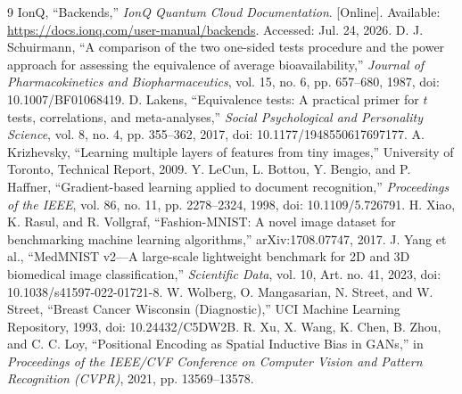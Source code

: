 \documentclass[11pt]{article}
\begin{document}
\begin{thebibliography}{9}
 IonQ, ``Backends,'' \textit{IonQ Quantum Cloud Documentation}. [Online]. Available: \url{https://docs.ionq.com/user-manual/backends}. Accessed: Jul. 24, 2026.
 D. J. Schuirmann, ``A comparison of the two one-sided tests procedure and the power approach for assessing the equivalence of average bioavailability,'' \textit{Journal of Pharmacokinetics and Biopharmaceutics}, vol. 15, no. 6, pp. 657--680, 1987, doi: 10.1007/BF01068419.
 D. Lakens, ``Equivalence tests: A practical primer for $t$ tests, correlations, and meta-analyses,'' \textit{Social Psychological and Personality Science}, vol. 8, no. 4, pp. 355--362, 2017, doi: 10.1177/1948550617697177.
 A. Krizhevsky, ``Learning multiple layers of features from tiny images,'' University of Toronto, Technical Report, 2009.
 Y. LeCun, L. Bottou, Y. Bengio, and P. Haffner, ``Gradient-based learning applied to document recognition,'' \textit{Proceedings of the IEEE}, vol. 86, no. 11, pp. 2278--2324, 1998, doi: 10.1109/5.726791.
 H. Xiao, K. Rasul, and R. Vollgraf, ``Fashion-MNIST: A novel image dataset for benchmarking machine learning algorithms,'' arXiv:1708.07747, 2017.
 J. Yang et al., ``MedMNIST v2---A large-scale lightweight benchmark for 2D and 3D biomedical image classification,'' \textit{Scientific Data}, vol. 10, Art. no. 41, 2023, doi: 10.1038/s41597-022-01721-8.
 W. Wolberg, O. Mangasarian, N. Street, and W. Street, ``Breast Cancer Wisconsin (Diagnostic),'' UCI Machine Learning Repository, 1993, doi: 10.24432/C5DW2B.
 R. Xu, X. Wang, K. Chen, B. Zhou, and C. C. Loy, ``Positional Encoding as Spatial Inductive Bias in GANs,'' in \textit{Proceedings of the IEEE/CVF Conference on Computer Vision and Pattern Recognition (CVPR)}, 2021, pp. 13569--13578.
\end{thebibliography}
\end{document}
